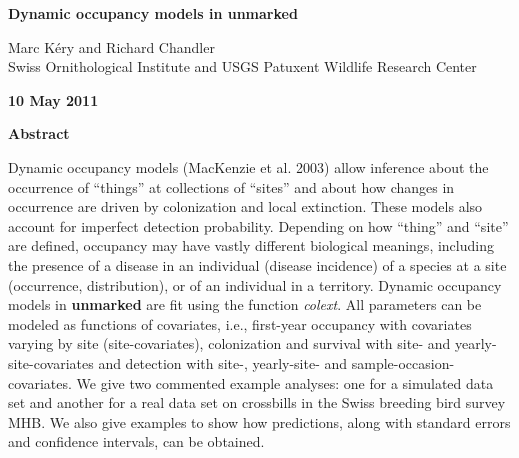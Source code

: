 \documentclass[12pt]{article}
\begin{document}

\vspace{1 cm}

\begin{center}
 \Large \textbf{Dynamic occupancy models in unmarked}
\end{center}

\vspace{1 cm}

\noindent Marc K\'{e}ry and Richard Chandler\\

\noindent Swiss Ornithological Institute and USGS Patuxent Wildlife Research Center \\

\vspace{1 cm}
\begin{center}
 \textbf{10 May 2011}
\end{center}



\vspace{1 cm}

\begin{center}
 \textbf{Abstract}
\end{center}
Dynamic occupancy models (MacKenzie et al. 2003) allow inference about
the occurrence of ``things'' at collections of ``sites''
and about how changes in occurrence are driven by colonization and
local extinction. These models also account for imperfect detection
probability. Depending on how ``thing'' and ``site'' are defined,
occupancy may have vastly different biological meanings,
including the presence of a disease in an individual (disease
incidence) of a species at a site (occurrence, distribution), or of an
individual in a territory.
Dynamic occupancy models in \textbf{unmarked} are fit using the
function \emph{colext}.
All parameters can be modeled as functions of covariates, i.e.,
first-year occupancy with covariates varying by site
(site-covariates),
colonization and survival with site- and yearly-site-covariates and
detection with site-, yearly-site- and sample-occasion-covariates.
We give two commented example analyses: one for a simulated data set
and another for a real data set on crossbills in the Swiss breeding
bird survey MHB.
We also give examples to show how predictions, along with standard
errors and confidence intervals, can be obtained.


\newpage
\end{document}
